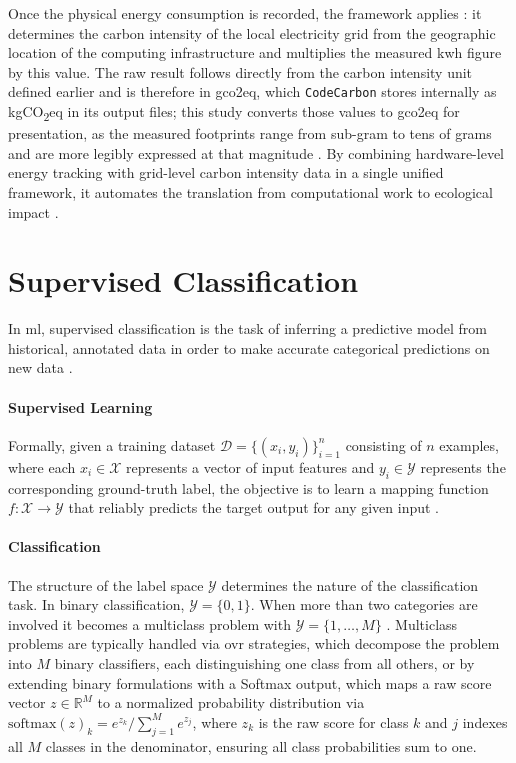 Once the physical energy consumption is recorded, the framework applies : it determines the carbon intensity of the local electricity grid from the geographic location of the computing infrastructure and multiplies the measured \gls{kwh} figure by this value. The raw result follows directly from the carbon intensity unit defined earlier and is therefore in \gls{gco2eq}, which \texttt{CodeCarbon} stores internally as kgCO\textsubscript{2}eq in its output files; this study converts those values to \gls{gco2eq} for presentation, as the measured footprints range from sub-gram to tens of grams and are more legibly expressed at that magnitude \parencite{dodgeMeasuringCarbonIntensity2022}. By combining hardware-level energy tracking with grid-level carbon intensity data in a single unified framework, it automates the translation from computational work to ecological impact \parencite{hendersonSystematicReportingEnergy2020}.

\section{Supervised Classification}
\label{sec:theoretical_classification}

In \gls{ml}, supervised classification is the task of inferring a predictive model from historical, annotated data in order to make accurate categorical predictions on new data \parencite{hastieElementsStatisticalLearning2017}.

\paragraph{Supervised Learning} Formally, given a training dataset $\mathcal{D} = \{(x_i, y_i)\}_{i=1}^{n}$ consisting of $n$ examples, where each $x_i \in \mathcal{X}$ represents a vector of input features and $y_i \in \mathcal{Y}$ represents the corresponding ground-truth label, the objective is to learn a mapping function $f: \mathcal{X} \to \mathcal{Y}$ that reliably predicts the target output for any given input \parencite{gorishniyRevisitingDeepLearning2021a}.

\paragraph{Classification} The structure of the label space $\mathcal{Y}$ determines the nature of the classification task. In binary classification, $\mathcal{Y} = \{0, 1\}$. When more than two categories are involved it becomes a multiclass problem with $\mathcal{Y} = \{1, \ldots, M\}$ \parencite{gorishniyRevisitingDeepLearning2021a}. Multiclass problems are typically handled via \gls{ovr} strategies, which decompose the problem into $M$ binary classifiers, each distinguishing one class from all others, or by extending binary formulations with a Softmax output, which maps a raw score vector $z \in \mathbb{R}^M$ to a normalized probability distribution via $\text{softmax}(z)_k = e^{z_k} / \sum_{j=1}^{M} e^{z_j}$, where $z_k$ is the raw score for class $k$ and $j$ indexes all $M$ classes in the denominator, ensuring all class probabilities sum to one.

